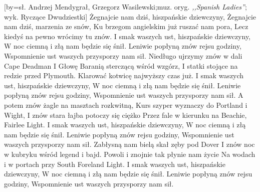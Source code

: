 [by={sł. Andrzej Mendygrał, Grzegorz Wasilewski;\break muz. oryg. \textit{,,Spanish Ladies''}; wyk. Ryczące Dwudziestki}]
\calcchordswidth{\[C H7 e]}
\beginverse
\clist{\[e C h7]}Żegnajcie nam dziś, hiszpańskie dziewczyny,
\clist{\[e G D]}Żegnajcie nam dziś, marzenia ze snów,
\clist{\[C D e]}Ku brzegom angielskim już ruszać nam pora,
\clist{\[C H7 e]}Lecz kiedyś na pewno wrócimy tu znów.
\endverse
\beginchorus\memorize[chorus]
\clist{\[e G D]}I smak waszych ust, hiszpańskie dziewczyny,
\clist{\[e G D]}W noc ciemną i złą nam będzie się śnił.
\clist{\[C D e]}Leniwie popłyną znów rejsu godziny,
\clist{\[C H7 e]}Wspomnienie ust waszych przysporzy nam sił.
\endchorus
\beginverse
\clist{^}Niedługo ujrzymy znów w dali Cape Deadman
\clist{^}I Głowę Baranią sterczącą wśród wzgórz,
\clist{^}I statki stojące na redzie przed Plymouth.
\clist{^}Klarować kotwicę najwyższy czas już.
\endverse
\ifphone
\beginchorus\replay[chorus]
\clist{^}I smak waszych ust, hiszpańskie dziewczyny,
\clist{^}W noc ciemną i złą nam będzie się śnił.
\clist{^}Leniwie popłyną znów rejsu godziny,
\clist{^}Wspomnienie ust waszych przysporzy nam sił.
\endchorus
\fi
\beginverse
\clist{^}A potem znów żagle na masztach rozkwitną,
\clist{^}Kurs szyper wyznaczy do Portland i Wight,
\clist{^}I znów stara łajba potoczy się ciężko
\clist{^}Przez fale w kierunku na Beachie, Fairlee Light.
\endverse
\ifphone
\beginchorus\replay[chorus]
\clist{^}I smak waszych ust, hiszpańskie dziewczyny,
\clist{^}W noc ciemną i złą nam będzie się śnił.
\clist{^}Leniwie popłyną znów rejsu godziny,
\clist{^}Wspomnienie ust waszych przysporzy nam sił.
\endchorus
\fi
\beginverse
\clist{^}Zabłysną nam bielą skał zęby pod Dover
\clist{^}I znów noc w kubryku wśród legend i bajd.
\clist{^}Powoli i znojnie tak płynie nam życie
\clist{^}Na wodach i w portach przy \brk South Foreland Light.
\endverse
\ifphone
\beginchorus\replay[chorus]
\clist{^}I smak waszych ust, hiszpańskie dziewczyny,
\clist{^}W noc ciemną i złą nam będzie się śnił.
\clist{^}Leniwie popłyną znów rejsu godziny,
\clist{^}Wspomnienie ust waszych przysporzy nam sił.
\endchorus
\fi
\endsong
